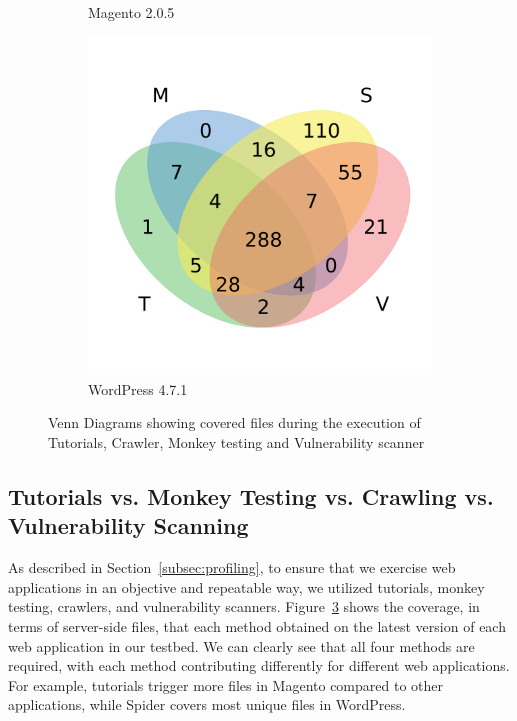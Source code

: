 \begin{figure}[t]
\begin{subfigure}[b]{0.22\textwidth}
          \caption{\scriptsize{Magento 2.0.5}}
          \label{fig:venn_mgt}
    \end{subfigure}
    \begin{subfigure}[b]{0.22\textwidth}
          \includegraphics[width=\textwidth]{figures/venn_wp.pdf}
          \caption{\scriptsize{WordPress 4.7.1}}
          \label{fig:venn_wp}
    \end{subfigure}
  \caption{Venn Diagrams showing covered files during the execution of Tutorials, Crawler, Monkey testing and Vulnerability scanner}
  \label{fig:venncoverage}
\end{figure}

\subsection{Tutorials vs. Monkey Testing vs. Crawling vs. Vulnerability Scanning}
As described in Section~\ref{subsec:profiling}, to ensure that we exercise web applications in an objective and repeatable way, we utilized tutorials, monkey testing, crawlers, and vulnerability scanners. Figure~\ref{fig:venncoverage} shows the coverage, in terms of server-side files, that each method obtained on the latest version of each web application in our testbed. We can clearly see that all four methods are required, with each method contributing differently for different web applications.
For example, tutorials trigger more files in Magento compared to other applications, while Spider covers most unique files in WordPress.


